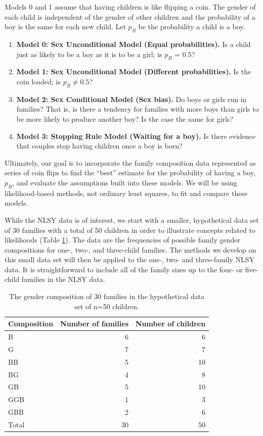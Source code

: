\documentclass[
]{krantz}
\providecommand{\tightlist}{%
  \setlength{\itemsep}{0pt}\setlength{\parskip}{0pt}}
\begin{document}
Models 0 and 1 assume that having children is like flipping a coin. The gender of each child is independent of the gender of other children and the probability of a boy is the same for each new child. Let \(p_B\) be the probability a child is a boy.

\begin{enumerate}
\def\labelenumi{\arabic{enumi}.}
\tightlist
\item
  \textbf{Model 0: Sex Unconditional Model (Equal probabilities).} Is a child just as likely to be a boy as it is to be a girl; is \(p_B\) = 0.5?
\item
  \textbf{Model 1: Sex Unconditional Model (Different probabilities).} Is the coin loaded; is \(p_B \neq 0.5\)?
\item
  \textbf{Model 2: Sex Conditional Model (Sex bias).} Do boys or girls run in families? That is,
  is there a tendency for families with more boys than girls to be more likely to produce another boy? Is the case the same for girls?
\item
  \textbf{Model 3: Stopping Rule Model (Waiting for a boy).}
  Is there evidence that couples stop having children once a boy is born?
\end{enumerate}

Ultimately, our goal is to incorporate the family composition data represented as series of coin flips to find the ``best'' estimate for the probability of having a boy, \(p_B\), and evaluate the assumptions built into these models. We will be using likelihood-based methods, not ordinary least squares, to fit and compare these models.

While the NLSY data is of interest, we start with a smaller, hypothetical data set of 30 families with a total of 50 children in order to illustrate concepts related to likelihoods (Table \ref{tab:table1chp2}). The data are the frequencies of possible family gender compositions for one-, two-, and three-child families. The methods we develop on this small data set will then be applied to the one-, two- and three-family NLSY data. It is straightforward to include all of the family sizes up to the four- or five-child families in the NLSY data.

\begin{table}
\centering
\caption{\label{tab:table1chp2}The gender composition of 30 families in the hypothetical data set of n=50 children.}
\centering
\begin{tabular}[t]{lrr}
\toprule
Composition & Number of families & Number of children\\
\midrule
B & 6 & 6\\
G & 7 & 7\\
BB & 5 & 10\\
BG & 4 & 8\\
GB & 5 & 10\\
\addlinespace
GGB & 1 & 3\\
GBB & 2 & 6\\
Total & 30 & 50\\
\bottomrule
\end{tabular}
\end{table}
\end{document}
